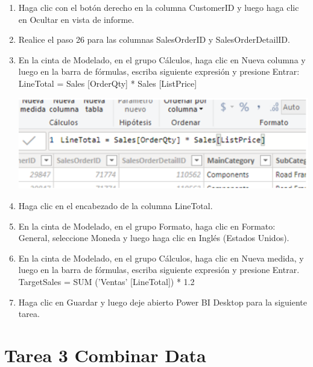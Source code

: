 \documentclass[12pt,letterpaper]{article}
\begin{document}
\begin{enumerate}
    \item Haga clic con el botón derecho en la columna CustomerID y luego haga clic en Ocultar en vista de informe.
    
    
    \item Realice el paso 26 para las columnas SalesOrderID y SalesOrderDetailID.
    
    
    \item En la cinta de Modelado, en el grupo Cálculos, haga clic en Nueva columna y luego en la barra de fórmulas, escriba
siguiente expresión y presione Entrar:
LineTotal = Sales [OrderQty] * Sales [ListPrice]

    \begin{center}
	\includegraphics[width=13cm]{./Imagenes/5}
	\end{center}

    \item Haga clic en el encabezado de la columna LineTotal.
    
     
    \item En la cinta de Modelado, en el grupo Formato, haga clic en Formato: General, seleccione Moneda y luego haga clic en Inglés (Estados Unidos).
 
    \item En la cinta de Modelado, en el grupo Cálculos, haga clic en Nueva medida, y luego en la barra de fórmulas, escriba
siguiente expresión y presione Entrar.
TargetSales = SUM ('Ventas' [LineTotal]) * 1.2
    \item Haga clic en Guardar y luego deje abierto Power BI Desktop para la siguiente tarea.
    

\end{enumerate}



\section{Tarea 3 Combinar Data}
\end{document}
